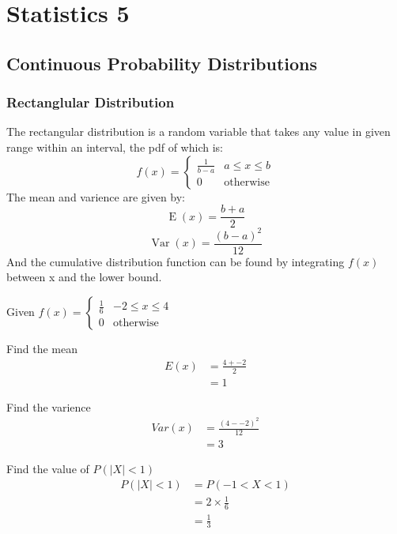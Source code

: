 \chapter*{Statistics 5}

\newpage
\section{Continuous Probability Distributions}

    \newpage
    \subsection{Rectanglular Distribution}
        The rectangular distribution is a random variable that takes any value in given range within an interval, the pdf of which is:
        $$
        f(x) = 
        \begin{cases}
        \frac{1}{b - a} & a \leq x \leq b\\
        0 & \text{otherwise}
        \end{cases}
        $$
        The mean and varience are given by:
        $$\operatorname{E}(x) = \frac{b + a}{2}$$
        $$\operatorname{Var}(x) = \frac{(b - a)^2}{12}$$
        And the cumulative distribution function can be found by integrating $f(x)$ between x and the lower bound.

        \begin{example}
        {
            Given $
            f(x) = 
            \begin{cases}
                \frac{1}{6} & -2 \leq x \leq 4\\
                0 & \text{otherwise}
            \end{cases}
            $
        }

        \begin{step}{Find the mean}
        \begin{align*}
        E(x) &= \frac{4 + -2}{2} \\
             &= 1
        \end{align*}
        \end{step}

        \begin{step}{Find the varience}
        \begin{align*}
        Var(x) &= \frac{(4 - -2)^2}{12} \\
               &= 3
        \end{align*}
        \end{step}

        \begin{step}{Find the value of $P(|X| < 1)$}
        \begin{align*}
        P(|X| < 1) &= P(-1 < X < 1) \\
                   &= 2 \times \frac{1}{6} \\
                   &= \frac{1}{3}
        \end{align*}
        \end{step}

        \end{example}


